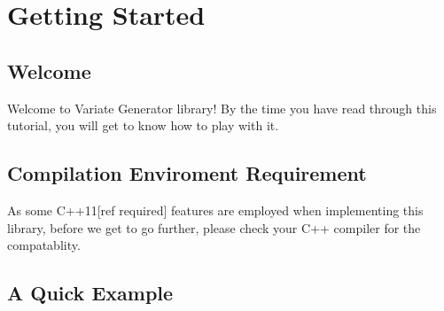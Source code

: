 \section{Getting Started}

\subsection{Welcome}

Welcome to Variate Generator library! 
By the time you have read through this tutorial, you will get to know how to play with it.

\subsection{Compilation Enviroment Requirement}

As some C++11[ref required] features are employed when implementing this library, before we get to go further, please check your C++ compiler for the compatablity.

\subsection{A Quick Example}

